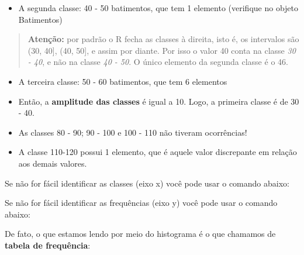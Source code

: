 \documentclass[
]{book}
\newenvironment{Shaded}{\begin{snugshade}}{\end{snugshade}}
\newcommand{\CommentTok}[1]{\textcolor[rgb]{0.56,0.35,0.01}{\textit{#1}}}
\newcommand{\FunctionTok}[1]{\textcolor[rgb]{0.13,0.29,0.53}{\textbf{#1}}}
\newcommand{\NormalTok}[1]{#1}
\newcommand{\SpecialCharTok}[1]{\textcolor[rgb]{0.81,0.36,0.00}{\textbf{#1}}}
\providecommand{\tightlist}{%
  \setlength{\itemsep}{0pt}\setlength{\parskip}{0pt}}
\begin{document}
\begin{itemize}
\tightlist
\item
  A segunda classe: 40 - 50 batimentos, que tem 1 elemento (verifique no objeto Batimentos)
\end{itemize}

\begin{quote}
\textbf{Atenção:} por padrão o R fecha as classes à direita, isto é, os intervalos são (30, 40{]}, (40, 50{]}, e assim por diante. Por isso o valor 40 conta na classe \emph{30 - 40}, e não na classe \emph{40 - 50}. O único elemento da segunda classe é o 46.
\end{quote}

\begin{itemize}
\item
  A terceira classe: 50 - 60 batimentos, que tem 6 elementos
\item
  Então, a \textbf{amplitude das classes} é igual a 10. Logo, a primeira classe é de 30 - 40.
\item
  As classes 80 - 90; 90 - 100 e 100 - 110 não tiveram ocorrências!
\item
  A classe 110-120 possui 1 elemento, que é aquele valor discrepante em relação aos demais valores.
\end{itemize}

Se não for fácil identificar as classes (eixo x) você pode usar o comando abaixo:

\begin{Shaded}
\end{Shaded}

Se não for fácil identificar as frequências (eixo y) você pode usar o comando abaixo:

\begin{Shaded}
\end{Shaded}

De fato, o que estamos lendo por meio do histograma é o que chamamos de \textbf{tabela de frequência}:
\end{document}
